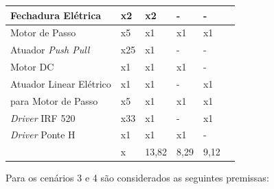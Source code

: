 \begin{table}[H]
\begin{adjustbox}{max width = \textwidth}
\begin{tabular}{|L{5cm}|C{2cm}|C{2cm}|C{2cm}|C{2cm}|C{2cm}|}
              Fechadura Elétrica & x2	 & x2 & - & -
             \\ \hline
              Motor de Passo & x5 & x1 & x1 & x1
             \\ \hline
             Atuador \textit{Push Pull} & x25	 & x1 & - & -
             \\ \hline
                Motor DC & x1 & x1 & x1 & -
             \\ \hline
                 Atuador Linear Elétrico & x1 & x1 & - & x1
             \\ \hline
                para Motor de Passo & x5 & x1 & x1 & x1
             \\ \hline
                \textit{Driver} IRF 520 & x33 & x1 & - & x1
             \\ \hline
                  \textit{Driver} Ponte H & x1 & x1 & x1 & -
             \\ \hline
              & x & 13,82 & 8,29 & 9,12 \\
             \hline
        \end{tabular}
    \end{adjustbox}
\end{table}

Para os cenários 3 e 4 são considerados as seguintes premissas: 
    
